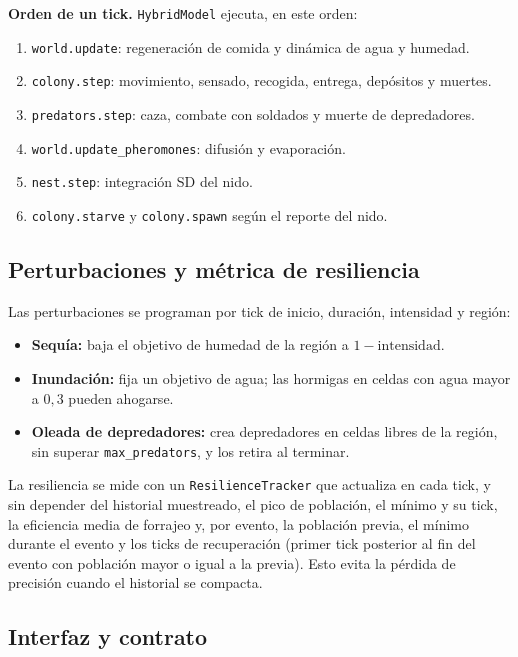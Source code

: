 \documentclass[11pt,a4paper]{article}
\newcommand{\code}[1]{\texttt{\small #1}}
\begin{document}
\textbf{Orden de un tick.} \code{HybridModel} ejecuta, en este orden:
\begin{enumerate}
  \item \code{world.update}: regeneración de comida y dinámica de agua y humedad.
  \item \code{colony.step}: movimiento, sensado, recogida, entrega, depósitos y muertes.
  \item \code{predators.step}: caza, combate con soldados y muerte de depredadores.
  \item \code{world.update\_pheromones}: difusión y evaporación.
  \item \code{nest.step}: integración SD del nido.
  \item \code{colony.starve} y \code{colony.spawn} según el reporte del nido.
\end{enumerate}

\subsection{Perturbaciones y métrica de resiliencia}

Las perturbaciones se programan por tick de inicio, duración, intensidad y región:

\begin{itemize}
  \item \textbf{Sequía:} baja el objetivo de humedad de la región a $1-\text{intensidad}$.
  \item \textbf{Inundación:} fija un objetivo de agua; las hormigas en celdas con agua mayor a $0{,}3$ pueden ahogarse.
  \item \textbf{Oleada de depredadores:} crea depredadores en celdas libres de la región, sin superar \code{max\_predators}, y los retira al terminar.
\end{itemize}

La resiliencia se mide con un \code{ResilienceTracker} que actualiza en cada tick, y sin depender del historial muestreado, el pico de población, el mínimo y su tick, la eficiencia media de forrajeo y, por evento, la población previa, el mínimo durante el evento y los ticks de recuperación (primer tick posterior al fin del evento con población mayor o igual a la previa). Esto evita la pérdida de precisión cuando el historial se compacta.

\subsection{Interfaz y contrato}
\end{document}
